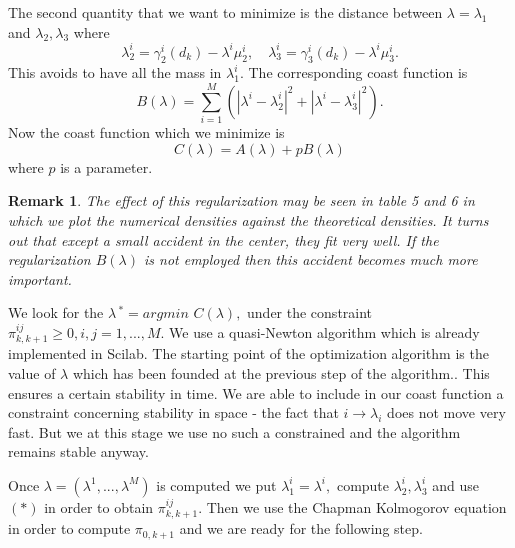 \documentclass[a4paper]{article}
\newtheorem{remark}{Remark}[section]
\begin{document}
The second quantity that we want to minimize is the distance between $%
\lambda =\lambda _{1}$ and $\lambda _{2},\lambda _{3}$ where
\[
\lambda _{2}^{i}=\gamma _{2}^{i}(d_{k})-\lambda ^{i}\mu _{2}^{i},\quad
\lambda _{3}^{i}=\gamma _{3}^{i}(d_{k})-\lambda ^{i}\mu _{3}^{i}.
\]
This avoids to have all the mass in $\lambda _{1}^{i}.$ The corresponding
coast function is
\[
B(\lambda )=\sum_{i=1}^{M}(\left| \lambda ^{i}-\lambda _{2}^{i}\right|
^{2}+\left| \lambda ^{i}-\lambda _{3}^{i}\right| ^{2}).
\]
Now the coast function which we minimize is
\[
C(\lambda )=A(\lambda )+pB(\lambda )
\]
where $p$ is a parameter.
\begin{remark}
The effect of this regularization may be seen in table 5 and 6 in
which we plot the numerical densities against the theoretical
densities. It turns out that except a small accident in the
center, they fit very well. If the regularization $B(\lambda)$ is
not employed then this accident becomes much more important.
\end{remark}

We look for the $\lambda \,^{*}=argmin$ $C(\lambda ),$ under the constraint $%
\pi _{k,k+1}^{ij}\geq 0,i,j=1,...,M.$ We use a quasi-Newton algorithm which
is already implemented in Scilab. The starting point of the optimization
algorithm is the value of $\lambda $ which has been founded at the previous
step of the algorithm.. This ensures a certain stability in time. We are
able to include in our coast function a constraint concerning stability in
space - the fact that $i\rightarrow \lambda _{i}$ does not move very fast.
But we at this stage we use no such a constrained and the algorithm remains
stable anyway.

Once $\lambda =(\lambda ^{1},...,\lambda ^{M})$ is computed we put $\lambda
_{1}^{i}=\lambda ^{i},$ compute $\lambda _{2}^{i},\lambda _{3}^{i}$ and use $%
(*)$ in order to obtain $\pi _{k,k+1}^{ij}.$ Then we use the Chapman
Kolmogorov equation in order to compute $\pi _{0,k+1}$ and we are ready for
the following step.
\end{document}
